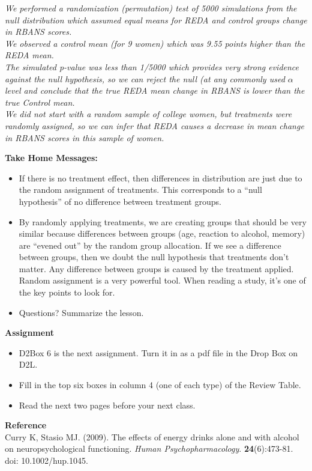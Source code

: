 \begin{enumerate}
\begin{key}
  {\it 
We performed a randomization (permutation) test of 5000 simulations
from the null distribution which assumed equal means for REDA and
control groups change in RBANS scores.\\
We observed a control mean (for 9 women) which was 9.55 points higher
than the REDA mean.\\
The simulated p-value was less than 1/5000 which provides very strong
evidence against the null hypothesis, so we can reject the null (at
any commonly used $\alpha$ level and conclude that the true REDA mean
change in RBANS is lower than the true Control mean.\\
We did not start with a random sample of college women, but treatments
were randomly assigned, so we can infer that REDA causes a decrease in
mean change in RBANS scores in this sample of women.
}
\end{key}


 \end{enumerate}


{\sf\bf Take Home Messages:}
\begin{itemize}
  \item 
  If there is no treatment effect, then differences in distribution
  are just due to the random assignment of treatments.  This
  corresponds to a ``null hypothesis'' of no difference between
  treatment groups.
\item  By randomly applying treatments, we are creating groups that
  should be very similar because differences between groups (age,
  reaction to alcohol, memory) are “evened out” by the random group
  allocation. If we see a difference between groups, then we doubt the
  null hypothesis that treatments don't matter.  Any difference
  between groups is caused by the treatment applied.  Random
  assignment is a very powerful tool.  When reading a study, it's one
  of the key points to look for. 
 \item 
  Questions? Summarize  the  lesson. \vfill

\end{itemize}



\noindent
{\bf Assignment} \vspace{-.2in}
\begin{itemize}
\item D2Box 6 is the next assignment.
    Turn it in as a pdf file in the Drop Box on D2L.
\item Fill in the top six  boxes in column 4 (one  of each type) of
  the Review Table.   
\item Read the next two pages before your next class.
\end{itemize}


{\sf\bf Reference}
\\
 Curry K, Stasio MJ.  (2009). The effects of energy drinks alone and with
 alcohol on neuropsychological functioning. {\it Human  Psychopharmacology}.
{\bf 24}(6):473-81. doi: 10.1002/hup.1045. 


